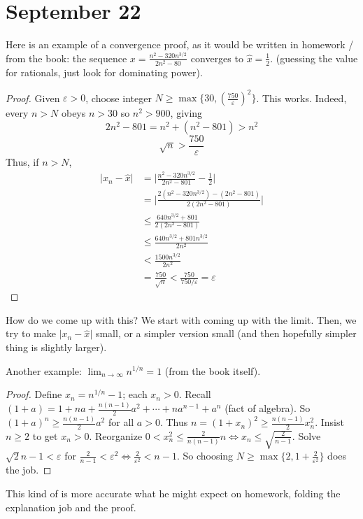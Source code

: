 \documentclass{article}
\theoremstyle{plain}
\theoremstyle{remark}
\newcommand{\ep}{{\varepsilon}}
\begin{document}
\section{September 22}
Here is an example of a convergence proof,
as it would be written in homework / from the book:
the sequence $x = \frac{n^2 - 320n^{3/2}}{2n^2 - 80}$ converges to $\hat{x} = \frac12$.
(guessing the value for rationals, just look for dominating power).
\begin{proof}
	Given $\ep > 0$, choose integer $N \geq \max\{30,\left(\frac{750}{\ep}\right)^2\}$.
	This works. Indeed, every $n > N$ obeys $n > 30$ so $n^2 > 900$,
	giving
	\begin{equation}
		2n^2 - 801 = n^2 + (n^2 - 801) > n^2
	\end{equation}
	\begin{equation}
		\sqrt{n} > \frac{750}{\ep}
	\end{equation}
	Thus, if $n > N$,
	\begin{align*}
		\lvert x_n - \hat{x} \rvert
		&= \lvert \frac{n^2 - 320n^{3/2}}{2n^2 - 801} - \frac{1}{2} \rvert\\
		&= \lvert \frac{2(n^2 - 320n^{3/2}) - (2n^2 - 801)}{2(2n^2-801)}\rvert\\
		& \leq \frac{640n^{3/2} + 801}{2(2n^2 - 801)}\\
		& \leq \frac{640n^{3/2} + 801n^{3/2}}{2n^2}\\
		& < \frac{1500n^{3/2}}{2n^2}\\
		&= \frac{750}{\sqrt{n}} < \frac{750}{750/\ep} = \ep
	\end{align*}
\end{proof}
How do we come up with this?
We start with coming up with the limit.
Then, we try to make $\lvert x_n - \hat{x}\rvert$ small,
or a simpler version small (and then hopefully simpler thing is slightly larger).

Another example: $\lim_{n\to\infty} n^{1/n} = 1$ (from the book itself).
\begin{proof}
	Define $x_n = n^{1/n} - 1$; each $x_n > 0$.
	Recall $(1 + a) = 1 + na + \frac{n(n-1)}{2}a^2 + \cdots + na^{n-1} + a^n$ (fact of algebra).
	So $(1 + a)^n \geq \frac{n(n-1)}{2}a^2$ for all $a > 0$.
	Thus $n = (1 + x_n)^2 \geq \frac{n(n-1)}{2}x_n^2$.
	Insist $n \geq 2$ to get $x_n > 0$.
	Reorganize $0 < x_n^2 \leq \frac{2}{n(n-1)}n \iff x_n \leq \sqrt{\frac{2}{n-1}}$.
	Solve $\sqrt{2}{n-1} < \ep$ for $\frac{2}{n-1} < \ep^2 \iff \frac{2}{\ep^2} < n-1$.
	So choosing $N \geq \max\{2,1+\frac{2}{\ep^2}\}$ does the job.
\end{proof}
This kind of is more accurate what he might expect on homework,
folding the explanation job and the proof.
\end{document}
